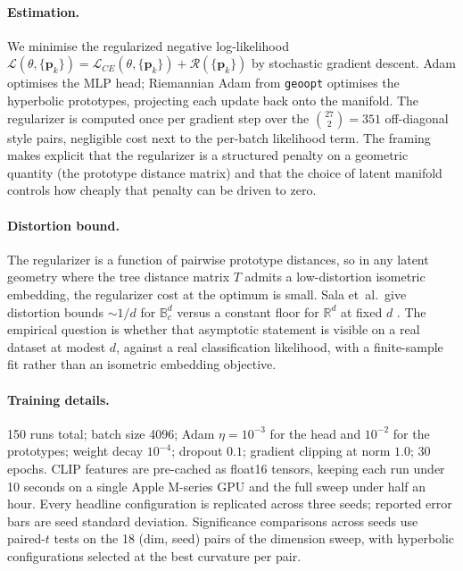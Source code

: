 \paragraph{Estimation.} We minimise the regularized negative
log-likelihood
$\mathcal{L}(\theta, \{\mathbf{p}_k\}) = \mathcal{L}_{CE}(\theta, \{\mathbf{p}_k\}) + \mathcal{R}(\{\mathbf{p}_k\})$
by stochastic gradient descent. Adam optimises the MLP head;
Riemannian Adam from \texttt{geoopt} \citep{kochurov2020geoopt}
optimises the hyperbolic prototypes, projecting each update back onto
the manifold. The regularizer is computed once per gradient step over
the $\binom{27}{2} = 351$ off-diagonal style pairs, negligible cost
next to the per-batch likelihood term. The framing makes explicit
that the regularizer is a structured penalty on a geometric quantity
(the prototype distance matrix) and that the choice of latent
manifold controls how cheaply that penalty can be driven to zero.

\paragraph{Distortion bound.} The regularizer is a
function of pairwise prototype distances, so in any latent geometry
where the tree distance matrix $T$ admits a low-distortion isometric
embedding, the regularizer cost at the optimum is small. Sala
et~al.\ give distortion bounds $\sim 1/d$ for $\mathbb{B}^d_c$ versus
a constant floor for $\mathbb{R}^d$ at fixed $d$
\citep{sala2018representation}. The empirical question is whether
that asymptotic statement is visible on a real dataset at modest
$d$, against a real classification likelihood, with a finite-sample
fit rather than an isometric embedding objective.

\paragraph{Training details.} 150 runs total; batch size 4096; Adam
$\eta = 10^{-3}$ for the head and $10^{-2}$ for the prototypes;
weight decay $10^{-4}$; dropout $0.1$; gradient clipping at norm
$1.0$; 30 epochs. CLIP features are pre-cached as float16 tensors,
keeping each run under 10 seconds on a single Apple M-series GPU and
the full sweep under half an hour. Every headline configuration is
replicated across three seeds; reported error bars are seed standard
deviation. Significance comparisons across seeds use paired-$t$ tests
on the 18 (dim, seed) pairs of the dimension sweep, with hyperbolic
configurations selected at the best curvature per pair.

